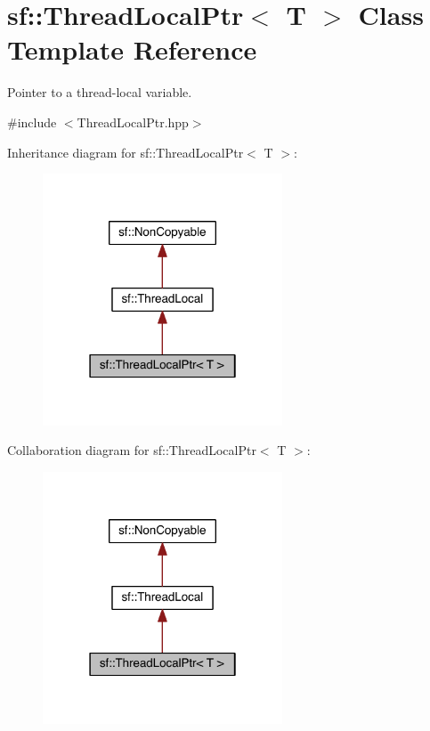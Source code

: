 \hypertarget{classsf_1_1_thread_local_ptr}{\section{sf\-:\-:Thread\-Local\-Ptr$<$ T $>$ Class Template Reference}
\label{classsf_1_1_thread_local_ptr}
}


Pointer to a thread-\/local variable.  




{\ttfamily \#include $<$Thread\-Local\-Ptr.\-hpp$>$}



Inheritance diagram for sf\-:\-:Thread\-Local\-Ptr$<$ T $>$\-:
\nopagebreak
\begin{figure}[H]
\begin{center}
\leavevmode
\includegraphics[width=202pt]{classsf_1_1_thread_local_ptr__inherit__graph}
\end{center}
\end{figure}


Collaboration diagram for sf\-:\-:Thread\-Local\-Ptr$<$ T $>$\-:
\nopagebreak
\begin{figure}[H]
\begin{center}
\leavevmode
\includegraphics[width=202pt]{classsf_1_1_thread_local_ptr__coll__graph}
\end{center}
\end{figure}
